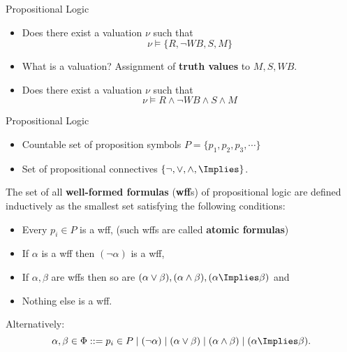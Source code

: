 \documentclass[xcolor=dvipsnames]{beamer}
\begin{document}
\begin{frame}{Propositional Logic}
\begin{itemize}
\item Does there exist a valuation $\nu$ such that 
\[\nu \models\{R,\lnot WB,S, M\}\]
\pause
\item What is a valuation?
\pause
Assignment of {\bf truth values} to $M,S,WB$.
\pause
\item Does there exist a valuation $\nu$ such that 
\[\nu \models R \land \lnot WB\land S\land M\]
\end{itemize}
\end{frame}



\begin{frame}{Propositional Logic}
\begin{itemize}
\item Countable set of proposition symbols $P=\{p_1,p_2,p_3,\cdots\}$
\item Set of propositional connectives $\{\lnot,\lor,\land,\Implies\}$. 
\end{itemize}
\pause
The set of all {\bf well-formed formulas} ({\bf wff}s) of propositional logic are defined inductively as the smallest set satisfying the following conditions:
\begin{itemize}
\item Every $p_i \in P$ is a wff, (such wffs are called {\bf atomic formulas})
\item If $\alpha$ is a wff then $(\lnot \alpha)$ is a wff,
\item If $\alpha,\beta$ are wffs then so are $(\alpha \lor \beta),(\alpha \land \beta),(\alpha \Implies \beta)$ and
\item Nothing else is a wff.
\end{itemize}
\pause
Alternatively:
\[\alpha,\beta \in \Phi::= p_i\in P \mid (\lnot \alpha) \mid (\alpha \lor \beta) \mid (\alpha \land \beta)\mid (\alpha \Implies \beta).\]
\end{frame}
\end{document}
